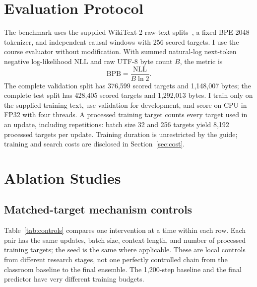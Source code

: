 \documentclass[10pt,a4paper]{article}
\begin{document}
\section{Evaluation Protocol}
The benchmark uses the supplied WikiText-2 raw-text splits~\cite{wikitext}, a fixed BPE-2048 tokenizer, and independent causal windows with 256 scored targets. I use the course evaluator without modification. With summed natural-log next-token negative log-likelihood $\mathrm{NLL}$ and raw UTF-8 byte count $B$, the metric is
\begin{equation}
 \mathrm{BPB}=\frac{\mathrm{NLL}}{B\ln 2}.
\end{equation}
The complete validation split has 376,599 scored targets and 1,148,007 bytes; the complete test split has 428,405 scored targets and 1,292,013 bytes. I train only on the supplied training text, use validation for development, and score on CPU in FP32 with four threads. A processed training target counts every target used in an update, including repetitions: batch size 32 and 256 targets yield 8,192 processed targets per update. Training duration is unrestricted by the guide; training and search costs are disclosed in Section~\ref{sec:cost}.

\section{Ablation Studies}
\subsection{Matched-target mechanism controls}
Table~\ref{tab:controls} compares one intervention at a time within each row. Each pair has the same updates, batch size, context length, and number of processed training targets; the seed is the same where applicable. These are local controls from different research stages, not one perfectly controlled chain from the classroom baseline to the final ensemble. The 1,200-step baseline and the final predictor have very different training budgets.
\end{document}
